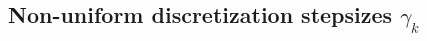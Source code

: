 \documentclass[11pt]{article}
\begin{document}

\subsection{Non-uniform discretization stepsizes $\gamma_k$}
\label{app:non-uniform-gamma}
\end{document}
